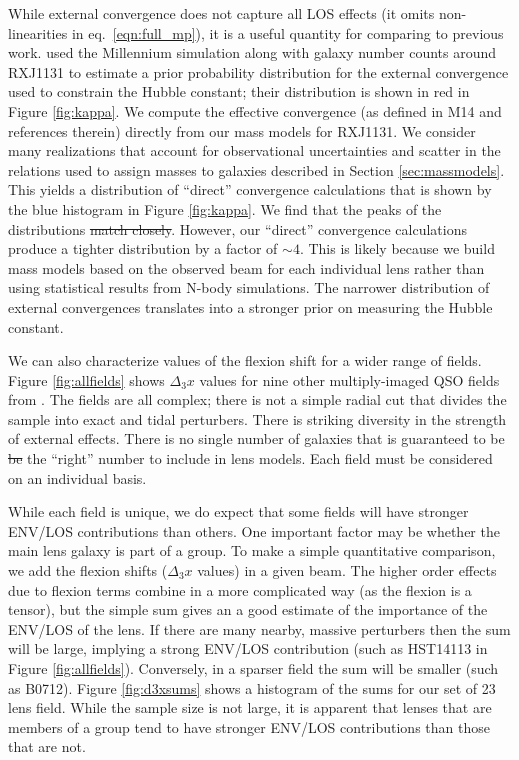 \documentclass{emulateapj}
\providecommand{\DIFaddtex}[1]{{\protect\color{blue}\uwave{#1}}} %
\providecommand{\DIFdeltex}[1]{{\protect\color{red}\sout{#1}}}                      %
\providecommand{\DIFaddbegin}{} %
\providecommand{\DIFaddend}{} %
\providecommand{\DIFdelbegin}{} %
\providecommand{\DIFdelend}{} %
\providecommand{\DIFadd}[1]{\texorpdfstring{\DIFaddtex{#1}}{#1}} %
\providecommand{\DIFdel}[1]{\texorpdfstring{\DIFdeltex{#1}}{}} %
\begin{document}
While external convergence does not capture all LOS effects (it omits non-linearities in eq.\ \ref{eqn:full_mp}), it is a useful quantity for comparing to previous work. \citet{Suyu13} \DIFaddbegin \DIFadd{(see also \mbox{%
\citealt{Rusu16}}%
) }\DIFaddend used the Millennium simulation along with galaxy number counts around RXJ1131 to estimate a prior probability distribution for the external convergence used to constrain the Hubble constant; their distribution is shown in red in Figure \ref{fig:kappa}. We compute the effective convergence (as defined in M14 and references therein) directly from our mass models for RXJ1131.  We consider many realizations that account for observational uncertainties and scatter in the relations used to assign masses to galaxies described in Section \ref{sec:massmodels}.  This yields a distribution of ``direct'' convergence calculations that is shown by the blue histogram in Figure \ref{fig:kappa}. We find that the peaks of the distributions \DIFdelbegin \DIFdel{match closely}\DIFdelend \DIFaddbegin \DIFadd{are roughly consistent}\DIFaddend . However, our ``direct'' convergence calculations produce a tighter distribution by a factor of $\sim 4$. This is likely because we build mass models based on the observed beam for each individual lens rather than using statistical results from N-body simulations. The narrower distribution of external convergences translates into a stronger prior on measuring the Hubble constant.

We can also characterize values of the flexion shift for a wider range of fields.  Figure \ref{fig:allfields} shows $\Delta_3 x$ values for nine other multiply-imaged QSO fields from \citet{Wong11}.  The fields are all complex; there is not a simple radial cut that divides the sample into exact and tidal perturbers.  There is striking diversity in the strength of external effects.  There is no single number of galaxies that is guaranteed to be \DIFdelbegin \DIFdel{be }\DIFdelend the ``right'' number to include in lens models.  Each field must be considered on an individual basis.

While each field is unique, we do expect that some fields will have stronger ENV/LOS contributions than others. One important factor may be whether the main lens galaxy is part of a group. To make a simple quantitative comparison, we add the flexion shifts ($\Delta_3 x$ values) in a given beam. The higher order effects due to flexion terms combine in a more complicated way (as the flexion is a tensor), but the simple sum gives an a good estimate of the importance of the ENV/LOS of the lens. If there are many nearby, massive perturbers then the sum will be large, implying a strong ENV/LOS contribution (such as HST14113 in Figure \ref{fig:allfields}). Conversely, in a sparser field the sum will be smaller (such as B0712). Figure \ref{fig:d3xsums} shows a histogram of the sums for our set of 23 lens field. While the sample size is not large, it is apparent that lenses that are members of a group tend to have stronger ENV/LOS contributions than those that are not.
\end{document}
